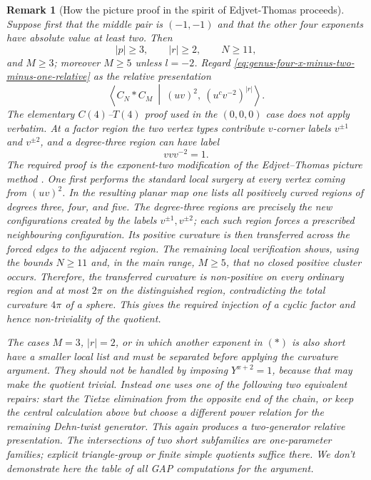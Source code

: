 \documentclass{article}
\newtheorem{remark}[theorem]{Remark}
\begin{document}
\begin{remark}[How the picture proof in the spirit of Edjvet-Thomas proceeds]
\label{rem:genus-four-x-minus-two-minus-one-picture-plan}
Suppose first that the middle pair is $(-1,-1)$ and that the other four
exponents have absolute value at least two.  Then
\[
       |p|\geq3,\qquad |r|\geq2,\qquad N\geq11,
\]
and $M\geq3$; moreover $M\geq5$ unless $l=-2$.  Regard
\eqref{eq:genus-four-x-minus-two-minus-one-relative} as the relative
presentation
\[
 \left\langle C_N*C_M\ \middle|\
       (uv)^2,\ (u^cv^{-2})^{|r|}
 \right\rangle .
\]
The elementary $C(4)$--$T(4)$ proof used in the $(0,0,0)$ case does not
apply verbatim.  At a factor region the two vertex types contribute
$v$-corner labels $v^{\pm1}$ and $v^{\pm2}$, and a degree-three region can
have label
\[
       vv v^{-2}=1.
\]
The required proof is the exponent-two modification of the
Edjvet--Thomas picture method \cite[Sections~3--4]{ET}.  One first performs
the standard local surgery at every vertex coming from $(uv)^2$.  In the
resulting planar map one lists all positively curved regions of degrees
three, four, and five.  The degree-three regions are precisely the new
configurations created by the labels $v^{\pm1},v^{\pm2}$; each such region
forces a prescribed neighbouring configuration.  Its positive curvature
is then transferred across the forced edges to the adjacent region.  The remaining local verification shows, using the bounds $N\geq11$
and, in the main range, $M\geq5$, that no closed positive cluster occurs.
Therefore, the transferred curvature is non-positive on every
ordinary region and at most $2\pi$ on the distinguished region, contradicting
the total curvature $4\pi$ of a sphere.  This gives the required injection of
a cyclic factor and hence non-triviality of the quotient.

The cases $M=3$, $|r|=2$, or in which another exponent in \((*)\) is also
short have a smaller local list and must be separated before applying the
curvature argument.  They should not be handled by imposing
$Y^{x+2}=1$, because that may make the quotient trivial.  Instead one uses
one of the following two equivalent repairs: start the Tietze elimination
from the opposite end of the chain, or keep the central calculation above
but choose a different power relation for the remaining Dehn-twist
generator.  This again produces a two-generator relative presentation.
The intersections of two short subfamilies are one-parameter families;
explicit triangle-group or finite simple quotients suffice there.  We don't demonstrate here the  table
of all GAP computations  for the argument.
\end{remark}
\end{document}
